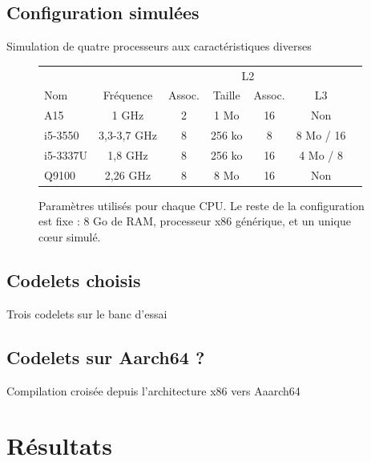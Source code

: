 \documentclass{beamer}
\begin{document}
\subsection{Configuration simulées}
\begin{frame}{Simulation de quatre processeurs aux caractéristiques diverses}
\begin{figure}[ht]
\begin{center}

\begin{tabular}{| l | c | c | c | c | c | c |}
\hline 
& & & \multicolumn{2}{c|}{L2} &\\
Nom & Fréquence & Assoc. & Taille & Assoc. & L3 \\
\hline

A15 & 1 GHz & 2 & 1 Mo & 16 & Non \\

i5-3550 & 3,3-3,7 GHz & 8 & 256 ko & 8 & 8 Mo / 16\\

i5-3337U & 1,8 GHz & 8 & 256 ko & 16 & 4 Mo / 8\\

Q9100 & 2,26 GHz & 8 & 8 Mo & 16 & Non\\
\hline

\end{tabular}
\caption{\label{cpu_setup}Paramètres utilisés pour chaque CPU. Le reste de la configuration est fixe : 8 Go de RAM, processeur x86 générique, et un unique cœur simulé.}
\end{center}
\end{figure}
\end{frame}

\subsection{Codelets choisis}
\begin{frame}{Trois codelets sur le banc d'essai}
\end{frame}

\subsection{Codelets sur Aarch64 ?}
\begin{frame}{Compilation croisée depuis l'architecture x86 vers Aaarch64}
\end{frame}

\section{Résultats}
\end{document}
